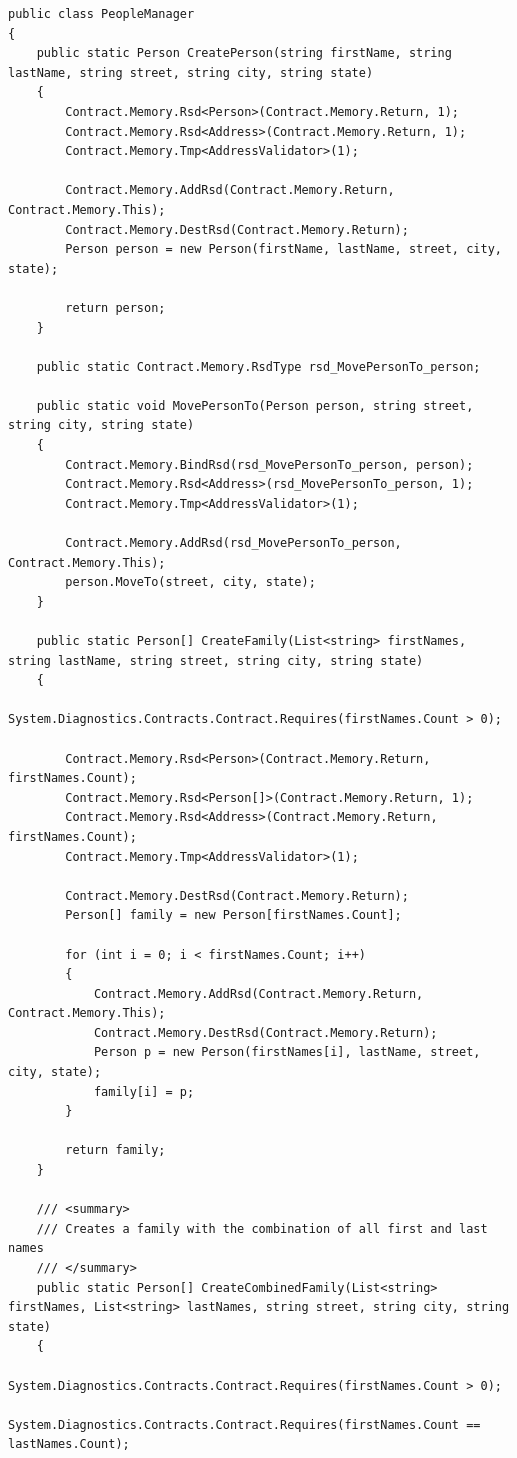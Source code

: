 \documentclass[12pt,a4paper]{article}
\begin{document}
			\begin{footnotesize}
			\begin{lstlisting}[caption=Clase PeopleManager]
public class PeopleManager
{
	public static Person CreatePerson(string firstName, string lastName, string street, string city, string state)
	{
		Contract.Memory.Rsd<Person>(Contract.Memory.Return, 1);
		Contract.Memory.Rsd<Address>(Contract.Memory.Return, 1);
		Contract.Memory.Tmp<AddressValidator>(1);

		Contract.Memory.AddRsd(Contract.Memory.Return, Contract.Memory.This);
		Contract.Memory.DestRsd(Contract.Memory.Return);
		Person person = new Person(firstName, lastName, street, city, state);

		return person;
	}

	public static Contract.Memory.RsdType rsd_MovePersonTo_person;

	public static void MovePersonTo(Person person, string street, string city, string state)
	{
		Contract.Memory.BindRsd(rsd_MovePersonTo_person, person);
		Contract.Memory.Rsd<Address>(rsd_MovePersonTo_person, 1);
		Contract.Memory.Tmp<AddressValidator>(1);

		Contract.Memory.AddRsd(rsd_MovePersonTo_person, Contract.Memory.This);
		person.MoveTo(street, city, state);
	}

	public static Person[] CreateFamily(List<string> firstNames, string lastName, string street, string city, string state)
	{
		System.Diagnostics.Contracts.Contract.Requires(firstNames.Count > 0);

		Contract.Memory.Rsd<Person>(Contract.Memory.Return, firstNames.Count);
		Contract.Memory.Rsd<Person[]>(Contract.Memory.Return, 1);
		Contract.Memory.Rsd<Address>(Contract.Memory.Return, firstNames.Count);
		Contract.Memory.Tmp<AddressValidator>(1);

		Contract.Memory.DestRsd(Contract.Memory.Return);
		Person[] family = new Person[firstNames.Count];

		for (int i = 0; i < firstNames.Count; i++)
		{
			Contract.Memory.AddRsd(Contract.Memory.Return, Contract.Memory.This);
			Contract.Memory.DestRsd(Contract.Memory.Return);
			Person p = new Person(firstNames[i], lastName, street, city, state);
			family[i] = p;
		}

		return family;
	}

	/// <summary>
	/// Creates a family with the combination of all first and last names
	/// </summary>
	public static Person[] CreateCombinedFamily(List<string> firstNames, List<string> lastNames, string street, string city, string state)
	{
			System.Diagnostics.Contracts.Contract.Requires(firstNames.Count > 0);
			System.Diagnostics.Contracts.Contract.Requires(firstNames.Count == lastNames.Count);


\end{lstlisting}
\end{footnotesize}
\end{document}
